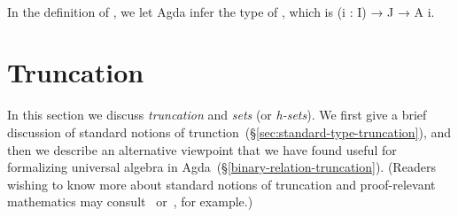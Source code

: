 \documentclass[a4paper,UKenglish,cleveref,autoref,thm-restate,11pt]{lipics-v2021}
\begin{document}
\begin{code}
\AgdaSymbol{(}\AgdaSpace{}%
\AgdaSpace{}%
\AgdaSpace{}%
\AgdaSymbol{)}\AgdaSpace{}%
\AgdaSpace{}%
\AgdaSpace{}%
\AgdaSymbol{)}\AgdaSpace{}%
\AgdaSpace{}%
\AgdaSpace{}%
\AgdaSpace{}%
\AgdaSpace{}%
\AgdaSpace{}%
\AgdaSpace{}%
\AgdaSpace{}%
\AgdaSpace{}%
\AgdaSpace{}%
\AgdaSpace{}%
\AgdaSpace{}%
\<%
\\
%
\>[1]\AgdaSpace{}%
\AgdaSpace{}%
%
\>[25]\AgdaSymbol{=}\AgdaSpace{}%
\AgdaSpace{}%
\AgdaSpace{}%
\AgdaSpace{}%
\AgdaSymbol{(}\AgdaSpace{}%
\AgdaSymbol{)}\AgdaSpace{}%
\AgdaSpace{}%
\AgdaSpace{}%
\AgdaSpace{}%
\AgdaSpace{}%
\AgdaSpace{}%
\AgdaSpace{}%
\AgdaSymbol{(}\AgdaSpace{}%
\AgdaSymbol{)(}\AgdaSpace{}%
\AgdaSymbol{)}\<%
\end{code}
\ccpad
In the definition of , we let Agda infer the type of , which is (\ab i \as : \ab I) \as → \ab J \as → \ab A \ab i.


\section{Truncation}\label{ssec:relation-truncation}

In this section we discuss \emph{truncation} and \emph{sets} (or \emph{h-sets}). We first give a brief discussion of standard notions of trunction~(\S\ref{sec:standard-type-truncation}), and then we describe an alternative viewpoint that we have found useful for formalizing universal algebra in Agda~(\S\ref{binary-relation-truncation}). (Readers wishing to know more about standard notions of truncation and proof-relevant mathematics may consult~\cite[\S34-35]{MHE} or~\cite[\S7.1]{HoTT:2013}, for example.)
\end{document}
